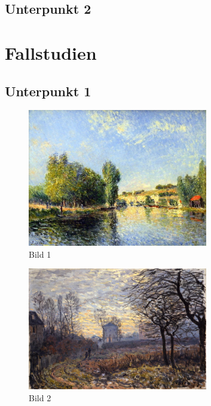 \documentclass[
	A4paper,
	DIV=9,
	BCOR7mm,
	smallheadings,
	headinclude,
	footinclude,
	headsepline,
	parindent,
	german,
	captions=tableheading,
	abstracton
	]{scrreprt}
\begin{document}
\blindtext[2]{}\autocite{:Aydin_2009}

\blindtext[2]{}\autocite{:Wintermantel_Medizintechnik}

\blindtext[1]{}\autocite{:Muelhardt_2013}
\section{Unterpunkt 2}
\blindtext[1]{}

\blindtext[2]{}

\blindtext[2]{}

\blindtext[1]{}
\chapter{Fallstudien}
\section{Unterpunkt 1}


\blindtext[1]{}\autocite{:Geschwinde_Rauschdrogen}

\blindtext[2]{}\blindtext[1]{}\autocite{:Muelhardt_2013}
\begin{figure}[htbp]
\begin{center}
\includegraphics[width=0.7\textwidth]{Abbildungen/Bild1.jpg}
\caption{Bild 1}
\label{fig:Bild1}
\end{center}
\end{figure}

\blindtext[2]{}\autocite{:Wintermantel_Medizintechnik}
\begin{figure}[htbp]
\begin{center}
\includegraphics[width=0.7\textwidth]{Abbildungen/Bild2.jpg}
\caption{Bild 2}
\label{fig:Bild2}
\end{center}
\end{figure}
\end{document}

